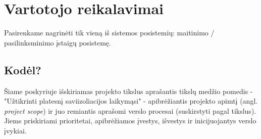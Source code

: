 \documentclass{VUMIFPSkursinis}
\begin{document}
\section{Vartotojo reikalavimai}

Pasirenkame nagrinėti tik vieną iš sistemos posistemių: maitinimo / pasilinksminimo įstaigų posistemę.

\subsection{Kodėl?}

Šiame poskyriuje išskiriamas projekto tikslus aprašantis tikslų medžio pomedis - "Užtikrinti platesnį saviizoliacijos laikymąsi" - apibrėžiantis projekto apimtį (angl. \emph{project scope}) ir 
juo remiantis aprašomi verslo procesai (suskirstyti pagal tikslus). Jiems priskiriami prioritetai, apibrėžiamos įvestys, išvestys ir inicijuojantys verslo įvykiai.
\end{document}
